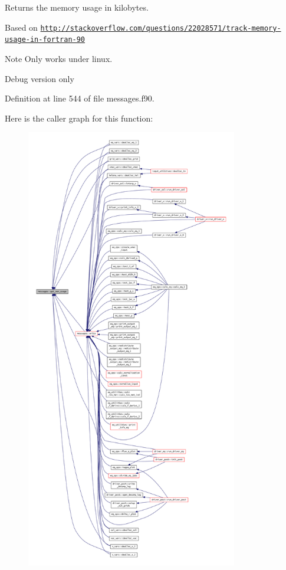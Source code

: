 Returns the memory usage in kilobytes. 

Based on \href{http://stackoverflow.com/questions/22028571/track-memory-usage-in-fortran-90}{\tt http\+://stackoverflow.\+com/questions/22028571/track-\/memory-\/usage-\/in-\/fortran-\/90}

\begin{DoxyNote}{Note}
Only works under linux.

Debug version only 
\end{DoxyNote}


Definition at line 544 of file messages.\+f90.

Here is the caller graph for this function\+:\nopagebreak
\begin{figure}[H]
\begin{center}
\leavevmode
\includegraphics[height=550pt]{namespacemessages_a82dddaab795b78b3d39e1ff1aab2f665_icgraph}
\end{center}
\end{figure}
\mbox{\label{namespacemessages_a5e45296f088e9f31115a3b8d869f3177}} 
